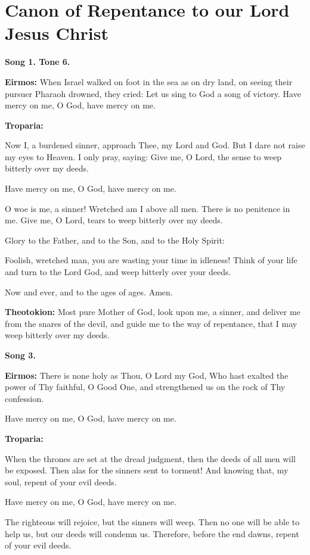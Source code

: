 \chapter{Canon of Repentance to our Lord Jesus Christ}

\textbf{Song 1. Tone 6.}

\textbf{Eirmos:} When Israel walked on foot in the sea as on dry land,
on seeing their pursuer Pharaoh drowned, they cried: Let us sing to God
a song of victory. Have mercy on me, O God, have mercy on me.

\textbf{Troparia:}

Now I, a burdened sinner, approach Thee, my Lord and God. But I dare not
raise my eyes to Heaven. I only pray, saying: Give me, O Lord, the sense
to weep bitterly over my deeds.

Have mercy on me, O God, have mercy on me.

O woe is me, a sinner! Wretched am I above all men. There is no
penitence in me. Give me, O Lord, tears to weep bitterly over my deeds.

Glory to the Father, and to the Son, and to the Holy Spirit:

Foolish, wretched man, you are wasting your time in idleness! Think of
your life and turn to the Lord God, and weep bitterly over your deeds.

Now and ever, and to the ages of ages. Amen.

\textbf{Theotokion:} Most pure Mother of God, look upon me, a sinner,
and deliver me from the snares of the devil, and guide me to the way of
repentance, that I may weep bitterly over my deeds.

\textbf{Song 3.}

\textbf{Eirmos:} There is none holy as Thou, O Lord my God, Who hast
exalted the power of Thy faithful, O Good One, and strengthened us on
the rock of Thy confession.

Have mercy on me, O God, have mercy on me.

\textbf{Troparia:}

When the thrones are set at the dread judgment, then the deeds of all
men will be exposed. Then alas for the sinners sent to torment! And
knowing that, my soul, repent of your evil deeds.

Have mercy on me, O God, have mercy on me.

The righteous will rejoice, but the sinners will weep. Then no one will
be able to help us, but our deeds will condemn us. Therefore, before the
end dawns, repent of your evil deeds.


